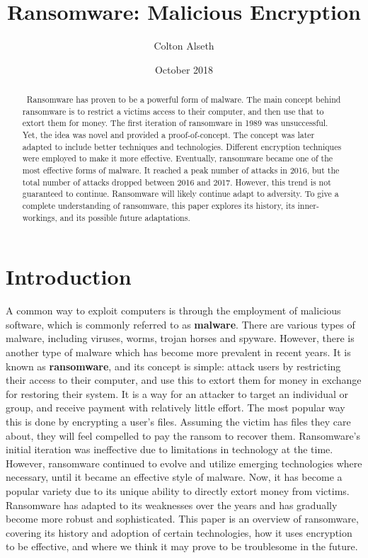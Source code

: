 \documentclass{IEEEtran}
\title{Ransomware: Malicious Encryption}
\author{Colton Alseth}
\date{October 2018}
\begin{document}
\pagestyle{plain}


\maketitle
\begin{abstract}
    ~Ransomware has proven to be a powerful form of malware. The main concept behind ransomware is to restrict a victims access to their computer, and then use that to extort them for money. The first iteration of ransomware in 1989 was unsuccessful. Yet, the idea was novel and provided a proof-of-concept. The concept was later adapted to include better techniques and technologies. Different encryption techniques were employed to make it more effective. Eventually, ransomware became one of the most effective forms of malware. It reached a peak number of attacks in 2016, but the total number of attacks dropped between 2016 and 2017. However, this trend is not guaranteed to continue. Ransomware will likely continue adapt to adversity. To give a complete understanding of ransomware, this paper explores its history, its inner-workings, and its possible future adaptations.
\end{abstract}

\tableofcontents

\listoffigures

\section{Introduction}

A common way to exploit computers is through the employment of malicious software, which is commonly referred to as \textbf{malware}. There are various types of malware, including viruses, worms, trojan horses and spyware. However, there is another type of malware which has become more prevalent in recent years. It is known as \textbf{ransomware}, and its concept is simple: attack users by restricting their access to their computer, and use this to extort them for money in exchange for restoring their system. It is a way for an attacker to target an individual or group, and receive payment with relatively little effort. The most popular way this is done by encrypting a user's files. Assuming the victim has files they care about, they will feel compelled to pay the ransom to recover them. Ransomware's initial iteration was ineffective due to limitations in technology at the time. However, ransomware continued to evolve and utilize emerging technologies where necessary, until it became an effective style of malware. Now, it has become a popular variety due to its unique ability to directly extort money from victims. Ransomware has adapted to its weaknesses over the years and has gradually become more robust and sophisticated. This paper is an overview of ransomware, covering its history and adoption of certain technologies, how it uses encryption to be effective, and where we think it may prove to be troublesome in the future.
\end{document}
